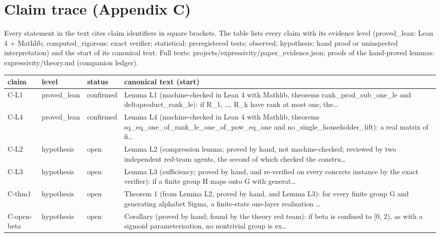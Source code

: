 \documentclass[10pt,twocolumn,a4paper]{article}
\begin{document}
\section{Claim trace (Appendix C)}
Every statement in the text cites claim identifiers in square brackets. The table lists every claim with its evidence level
(proved\_lean: Lean 4 + Mathlib; computed\_rigorous: exact verifier; statistical: preregistered tests; observed; hypothesis: hand
proof or uninspected interpretation) and the start of its canonical text. Full texts: projects/expressivity/paper\_evidence.json;
proofs of the hand-proved lemmas: expressivity/theory.md (companion ledger).
\begin{scriptsize}\begin{longtable}{@{}
  >{\raggedright\arraybackslash}p{}
  >{\raggedright\arraybackslash}p{}
  >{\raggedright\arraybackslash}p{}
  >{\raggedright\arraybackslash}p{}@{}}
\toprule\noalign{}
claim
 & level
 & status
 & canonical text (start)
 \\
\midrule\noalign{}
\bottomrule\noalign{}
C-L1 & proved\_lean & confirmed & Lemma L1 (machine-checked in Lean 4 with Mathlib, theorems rank\_prod\_sub\_one\_le and deltaproduct\_rank\_le): if R\_1, \ldots, R\_k have rank at most one, the\ldots{} \\
C-L4 & proved\_lean & confirmed & Lemma L4 (machine-checked in Lean 4 with Mathlib, theorems sq\_eq\_one\_of\_rank\_le\_one\_of\_pow\_eq\_one and no\_single\_householder\_lift): a real matrix of fi\ldots{} \\
C-L2 & hypothesis & open & Lemma L2 (compression lemma; proved by hand, not machine-checked; reviewed by two independent red-team agents, the second of which checked the constru\ldots{} \\
C-L3 & hypothesis & open & Lemma L3 (sufficiency; proved by hand, and re-verified on every concrete instance by the exact verifier): if a finite group H maps onto G with generat\ldots{} \\
C-thm1 & hypothesis & open & Theorem 1 (from Lemma L2, proved by hand, and Lemma L3): for every finite group G and generating alphabet Sigma, a finite-state one-layer realisation \ldots{} \\
C-open-beta & hypothesis & open & Corollary (proved by hand; found by the theory red team): if beta is confined to {[}0, 2), as with a sigmoid parameterisation, no nontrivial group is ex\ldots{} \\

\end{longtable}
\end{scriptsize}
\end{document}

